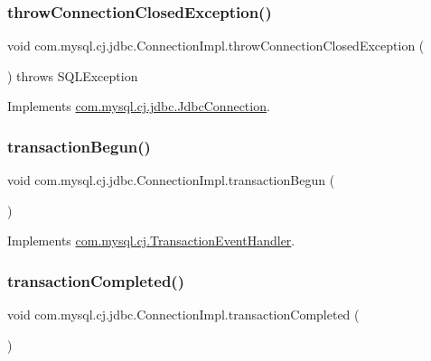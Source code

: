 \subsubsection{\texorpdfstring{throw\+Connection\+Closed\+Exception()}{throwConnectionClosedException()}}
{\footnotesize\ttfamily void com.\+mysql.\+cj.\+jdbc.\+Connection\+Impl.\+throw\+Connection\+Closed\+Exception (\begin{DoxyParamCaption}{ }\end{DoxyParamCaption}) throws S\+Q\+L\+Exception}



Implements \mbox{\hyperlink{interfacecom_1_1mysql_1_1cj_1_1jdbc_1_1_jdbc_connection_a8554721dac5197512681010d325b5e87}{com.\+mysql.\+cj.\+jdbc.\+Jdbc\+Connection}}.

\mbox{\label{classcom_1_1mysql_1_1cj_1_1jdbc_1_1_connection_impl_a7a80d752abc5d9a9b0b3b2a3b93f6d19}} 
\subsubsection{\texorpdfstring{transaction\+Begun()}{transactionBegun()}}
{\footnotesize\ttfamily void com.\+mysql.\+cj.\+jdbc.\+Connection\+Impl.\+transaction\+Begun (\begin{DoxyParamCaption}{ }\end{DoxyParamCaption})}



Implements \mbox{\hyperlink{interfacecom_1_1mysql_1_1cj_1_1_transaction_event_handler_a4c745069ad52c307d91f62b3ebff5c01}{com.\+mysql.\+cj.\+Transaction\+Event\+Handler}}.

\mbox{\label{classcom_1_1mysql_1_1cj_1_1jdbc_1_1_connection_impl_a83abf159abc9bcc5cda61fb4ff15fc63}} 
\subsubsection{\texorpdfstring{transaction\+Completed()}{transactionCompleted()}}
{\footnotesize\ttfamily void com.\+mysql.\+cj.\+jdbc.\+Connection\+Impl.\+transaction\+Completed (\begin{DoxyParamCaption}{ }\end{DoxyParamCaption})}



